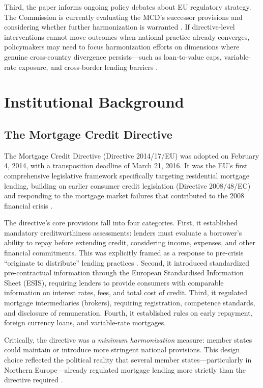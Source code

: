 \documentclass[12pt]{article}
\begin{document}
Third, the paper informs ongoing policy debates about EU regulatory strategy. The Commission is currently evaluating the MCD's successor provisions and considering whether further harmonization is warranted \citep{european_commission_2021_eval}. If directive-level interventions cannot move outcomes when national practice already converges, policymakers may need to focus harmonization efforts on dimensions where genuine cross-country divergence persists---such as loan-to-value caps, variable-rate exposure, and cross-border lending barriers \citep{fernandez_vidaurreta_2023_mortgage}.

\section{Institutional Background}
\label{sec:background}

\subsection{The Mortgage Credit Directive}

The Mortgage Credit Directive (Directive 2014/17/EU) was adopted on February 4, 2014, with a transposition deadline of March 21, 2016. It was the EU's first comprehensive legislative framework specifically targeting residential mortgage lending, building on earlier consumer credit legislation (Directive 2008/48/EC) and responding to the mortgage market failures that contributed to the 2008 financial crisis \citep{european_commission_2011_ia}.

The directive's core provisions fall into four categories. First, it established mandatory creditworthiness assessments: lenders must evaluate a borrower's ability to repay before extending credit, considering income, expenses, and other financial commitments. This was explicitly framed as a response to pre-crisis ``originate to distribute'' lending practices \citep{white_paper_2007}. Second, it introduced standardized pre-contractual information through the European Standardised Information Sheet (ESIS), requiring lenders to provide consumers with comparable information on interest rates, fees, and total cost of credit. Third, it regulated mortgage intermediaries (brokers), requiring registration, competence standards, and disclosure of remuneration. Fourth, it established rules on early repayment, foreign currency loans, and variable-rate mortgages.

Critically, the directive was a \textit{minimum harmonization} measure: member states could maintain or introduce more stringent national provisions. This design choice reflected the political reality that several member states---particularly in Northern Europe---already regulated mortgage lending more strictly than the directive required \citep{whitehead_scanlon_2014_mortgage}.
\end{document}
